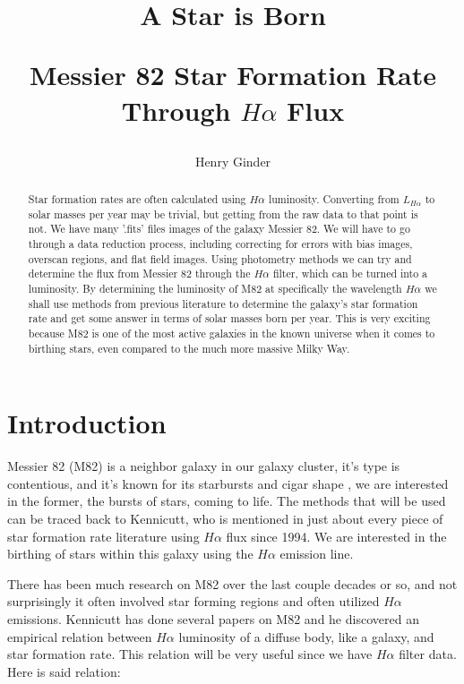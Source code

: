 \documentclass[modern]{aastex63}
\begin{document}
\title{A Star is Born

Messier 82 Star Formation Rate Through $H\alpha$ Flux}


\author{Henry Ginder}

\begin{abstract}
Star formation rates are often calculated using $H\alpha$ luminosity. Converting from $L_{H\alpha}$ to solar masses per year may be trivial, but getting from the raw data to that point is not. We have many '.fits' files images of the galaxy Messier 82. We will have to go through a data reduction process, including correcting for errors with bias images, overscan regions, and flat field images. Using photometry methods we can try and determine the flux from Messier 82 through the $H\alpha$ filter, which can be turned into a luminosity. By determining the luminosity of M82 at specifically the wavelength $H\alpha$ we shall use methods from previous literature to determine the galaxy's star formation rate and get some answer in terms of solar masses born per year. This is very exciting because M82 is one of the most active galaxies in the known universe when it comes to birthing stars, even compared to the much more massive Milky Way.
\end{abstract}

\section{Introduction}

Messier 82 (M82) is a neighbor galaxy in our galaxy cluster, it's type is contentious, and it's known for its starbursts and cigar shape \citep{2007ApJ...671..1550}, we are interested in the former, the bursts of stars, coming to life. The methods that will be used can be traced back to Kennicutt, who is mentioned in just about every piece of star formation rate literature using $H\alpha$ flux since 1994. We are interested in the birthing of stars within this galaxy using the $H\alpha$ emission line. 

There has been much research on M82 over the last couple decades or so, and not surprisingly it often involved star forming regions and often utilized $H\alpha$ emissions. Kennicutt has done several papers on M82 and he discovered an empirical relation between $H\alpha$ luminosity of a diffuse body, like a galaxy, and star formation rate. This relation will be very useful since we have $H\alpha$ filter data. Here is said relation:
\end{document}
